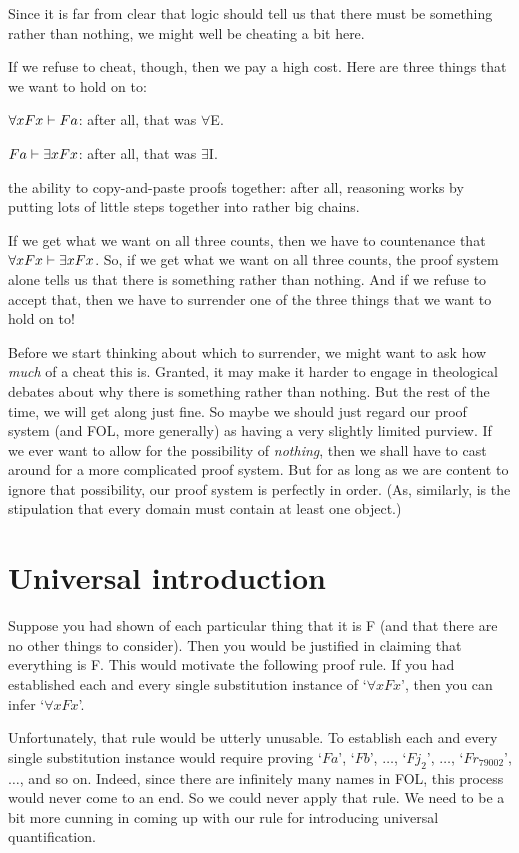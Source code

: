 Since it is far from clear that logic should tell us that there must be something rather than nothing, we might well be cheating a bit here. 

If we refuse to cheat, though, then we pay a high cost. Here are three things that we want to hold on to:
	\begin{ebullet}
		\item $\forall x Fx \vdash Fa$: after all, that was $\forall$E.
		\item $Fa \vdash \exists x Fx$: after all, that was $\exists$I.
		\item the ability to copy-and-paste proofs together: after all, reasoning works by putting lots of little steps together into rather big chains.
	\end{ebullet}
If we get what we want on all three counts, then we have to countenance that $\forall xFx \vdash \exists x Fx$. So, if we get what we want on all three counts, the proof system alone tells us that there is something rather than nothing. And if we refuse to accept that, then we have to surrender one of the three things that we want to hold on to!

Before we start thinking about which to surrender, we might want to ask how \emph{much} of a cheat this is. Granted, it may make it harder to engage in theological debates about why there is something rather than nothing. But the rest of the time, we will get along just fine. So maybe we should just regard our proof system (and FOL, more generally) as having a very slightly limited purview. If we ever want to allow for the possibility of \emph{nothing}, then we shall have to cast around for a more complicated proof system. But for as long as we are content to ignore that possibility, our proof system is perfectly in order. (As, similarly, is the stipulation that every domain must contain at least one object.)


\section{Universal introduction}
Suppose you had shown of each particular thing that it is F (and that there are no other things to consider). Then you would be justified in claiming that everything is F. This would motivate the following proof rule. If you had established each and every single substitution instance of `$\forall x Fx$', then you can infer `$\forall x Fx$'. 

Unfortunately, that rule would be utterly unusable. To establish each and every single substitution instance would require proving `$Fa$', `$Fb$', $\ldots$, `$Fj_2$', $\ldots$, `$Fr_{79002}$', $\ldots$, and so on. Indeed, since there are infinitely many names in FOL, this process would never come to an end. So we could never apply that rule. We need to be a bit more cunning in coming up with our rule for introducing universal quantification. 


